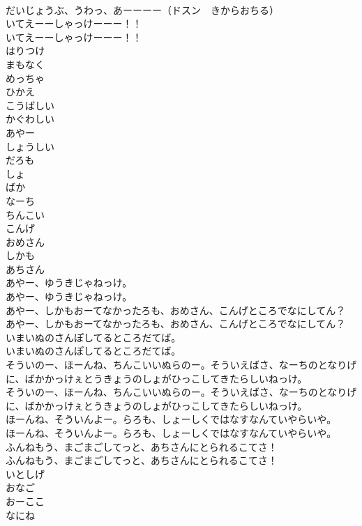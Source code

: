 \documentclass[8pt]{extreport}
\begin{document}
\begin{CJK}{UTF8}{min}
\\	だいじょうぶ、うわっ、あーーーー（ドスン　きからおちる） 
\\	いてえーーしゃっけーーー！！	
\\	いてえーーしゃっけーーー！！ 
\\	はりつけ
\\	まもなく
\\	めっちゃ
\\	ひかえ
\\	こうばしい
\\	かぐわしい
\\	あやー
\\	しょうしい
\\	だろも
\\	しょ
\\	ばか
\\	なーち
\\	ちんこい
\\	こんげ
\\	おめさん
\\	しかも
\\	あちさん
\\	あやー、ゆうきじゃねっけ。	
\\	あやー、ゆうきじゃねっけ。 
\\	あやー、しかもおーてなかったろも、おめさん、こんげところでなにしてん？	
\\	あやー、しかもおーてなかったろも、おめさん、こんげところでなにしてん？ 
\\	いまいぬのさんぽしてるところだてば。	
\\	いまいぬのさんぽしてるところだてば。 
\\	そういのー、ほーんね、ちんこいいぬらのー。そういえばさ、なーちのとなりげに、ばかかっけぇとうきょうのしょがひっこしてきたらしいねっけ。	
\\	そういのー、ほーんね、ちんこいいぬらのー。そういえばさ、なーちのとなりげに、ばかかっけぇとうきょうのしょがひっこしてきたらしいねっけ。 
\\	ほーんね、そういんよー。らろも、しょーしくではなすなんていやらいや。	
\\	ほーんね、そういんよー。らろも、しょーしくではなすなんていやらいや。 
\\	ふんねもう、まごまごしてっと、あちさんにとられるこてさ！	
\\	ふんねもう、まごまごしてっと、あちさんにとられるこてさ！ 
\\	いとしげ
\\	おなご
\\	おーここ
\\	なにね

\end{CJK}
\end{document}
